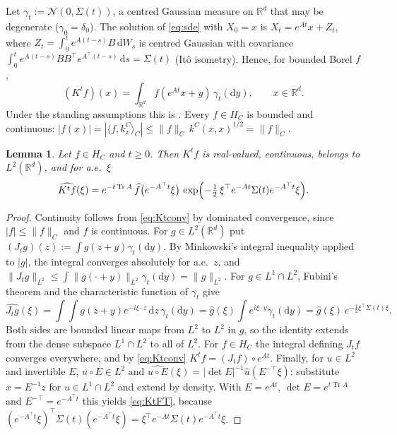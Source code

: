 \documentclass[11pt]{article}
\newtheorem{lemma}{Lemma}
\theoremstyle{definition}
\theoremstyle{remark}
\newcommand{\R}{\mathbb{R}}
\newcommand{\Tr}{\operatorname{Tr}}
\newcommand{\dd}{\,\mathrm{d}}
\newcommand{\ip}[2]{\langle #1,#2\rangle}
\newcommand{\hatf}[1]{\widehat{#1}}
\newcommand{\tp}{\top}
\begin{document}
Let $\gamma_t:=\mathcal N(0,\Sigma(t))$, a centred Gaussian measure on $\R^d$ that may be degenerate
($\gamma_0=\delta_0$). The solution of \eqref{eq:sde} with $X_0=x$ is $X_t=e^{At}x+Z_t$, where
$Z_t=\int_0^te^{A(t-s)}B\dd W_s$ is centred Gaussian with covariance $\int_0^te^{A(t-s)}BB^\tp e^{A^\tp(t-s)}\dd s=\Sigma(t)$
(It\^o isometry). Hence, for bounded Borel $f$,
\begin{equation}\label{eq:Ktconv}
(K^tf)(x)=\int_{\R^d}f(e^{At}x+y)\,\gamma_t(\mathrm dy),\qquad x\in\R^d .
\end{equation}
Under the standing assumptions this is \cite[(2.2)]{PSWPN}. Every $f\in H_C$ is bounded and continuous:
$|f(x)|=|\ip f{k^C_x}_C|\le\|f\|_C\,k^C(x,x)^{1/2}=\|f\|_C$.

\begin{lemma}\label{lem:Kt}
Let $f\in H_C$ and $t\ge0$. Then $K^tf$ is real-valued, continuous, belongs to $L^2(\R^d)$, and for a.e.\ $\xi$
\begin{equation}\label{eq:KtFT}
\hatf{K^tf}(\xi)=e^{-t\Tr A}\,\hatf f\bigl(e^{-A^\tp t}\xi\bigr)\,
\exp\Bigl(-\tfrac12\,\xi^\tp e^{-At}\Sigma(t)e^{-A^\tp t}\xi\Bigr).
\end{equation}
\end{lemma}

\begin{proof}
Continuity follows from \eqref{eq:Ktconv} by dominated convergence, since $|f|\le\|f\|_C$ and $f$ is continuous.
For $g\in L^2(\R^d)$ put $(J_tg)(z):=\int g(z+y)\gamma_t(\mathrm dy)$. By Minkowski's integral inequality applied to
$|g|$, the integral converges absolutely for a.e.\ $z$, and $\|J_tg\|_{L^2}\le\int\|g(\cdot+y)\|_{L^2}\gamma_t(\mathrm dy)=\|g\|_{L^2}$.
For $g\in L^1\cap L^2$, Fubini's theorem and the characteristic function of $\gamma_t$ give
\[
\hatf{J_tg}(\xi)=\int\!\!\int g(z+y)e^{-i\xi\cdot z}\dd z\,\gamma_t(\mathrm dy)=\hatf g(\xi)\int e^{i\xi\cdot y}\gamma_t(\mathrm dy)
=\hatf g(\xi)\,e^{-\frac12\xi^\tp\Sigma(t)\xi}.
\]
Both sides are bounded linear maps from $L^2$ to $L^2$ in $g$, so the identity extends from the dense subspace
$L^1\cap L^2$ to all of $L^2$. For $f\in H_C$ the integral defining $J_tf$ converges everywhere, and by
\eqref{eq:Ktconv} $K^tf=(J_tf)\circ e^{At}$. Finally, for $u\in L^2$ and invertible $E$, $u\circ E\in L^2$ and
$\hatf{u\circ E}(\xi)=|\det E|^{-1}\hatf u(E^{-\tp}\xi)$: substitute $x=E^{-1}z$ for $u\in L^1\cap L^2$ and extend by density.
With $E=e^{At}$, $\det E=e^{t\Tr A}$ and $E^{-\tp}=e^{-A^\tp t}$ this yields \eqref{eq:KtFT}, because
$(e^{-A^\tp t}\xi)^\tp\Sigma(t)(e^{-A^\tp t}\xi)=\xi^\tp e^{-At}\Sigma(t)e^{-A^\tp t}\xi$.
\end{proof}
\end{document}
